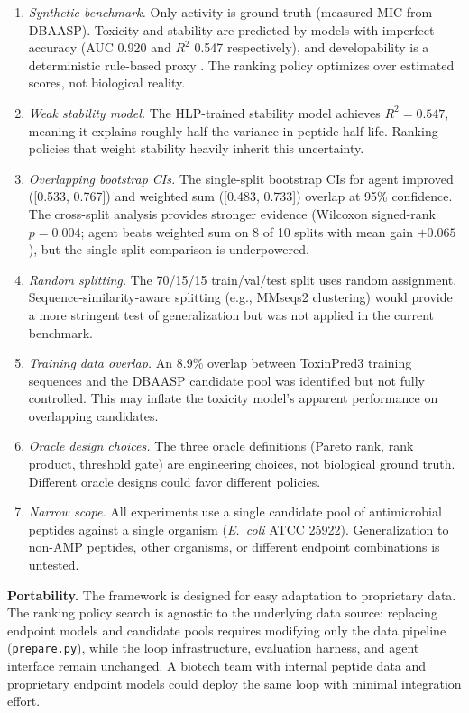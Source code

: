 \begin{enumerate}[nosep]
\item \emph{Synthetic benchmark.}
Only activity is ground truth (measured MIC from DBAASP).
Toxicity and stability are predicted by models with imperfect accuracy (AUC 0.920 and $R^2$ 0.547 respectively), and developability is a deterministic rule-based proxy \citep{fjell2012peptidedev}.
The ranking policy optimizes over estimated scores, not biological reality.

\item \emph{Weak stability model.}
The HLP-trained stability model achieves $R^2 = 0.547$, meaning it explains roughly half the variance in peptide half-life.
Ranking policies that weight stability heavily inherit this uncertainty.

\item \emph{Overlapping bootstrap CIs.}
The single-split bootstrap CIs for agent improved ([0.533, 0.767]) and weighted sum ([0.483, 0.733]) overlap at 95\% confidence.
The cross-split analysis provides stronger evidence (Wilcoxon signed-rank $p = 0.004$; agent beats weighted sum on 8 of 10 splits with mean gain $+0.065$), but the single-split comparison is underpowered.

\item \emph{Random splitting.}
The 70/15/15 train/val/test split uses random assignment.
Sequence-similarity-aware splitting (e.g., MMseqs2 clustering) would provide a more stringent test of generalization but was not applied in the current benchmark.

\item \emph{Training data overlap.}
An 8.9\% overlap between ToxinPred3 training sequences and the DBAASP candidate pool was identified but not fully controlled.
This may inflate the toxicity model's apparent performance on overlapping candidates.

\item \emph{Oracle design choices.}
The three oracle definitions (Pareto rank, rank product, threshold gate) are engineering choices, not biological ground truth.
Different oracle designs could favor different policies.

\item \emph{Narrow scope.}
All experiments use a single candidate pool of antimicrobial peptides against a single organism (\emph{E.~coli} ATCC 25922).
Generalization to non-AMP peptides, other organisms, or different endpoint combinations is untested.
\end{enumerate}

\textbf{Portability.}
The framework is designed for easy adaptation to proprietary data.
The ranking policy search is agnostic to the underlying data source: replacing endpoint models and candidate pools requires modifying only the data pipeline (\texttt{prepare.py}), while the loop infrastructure, evaluation harness, and agent interface remain unchanged.
A biotech team with internal peptide data and proprietary endpoint models could deploy the same loop with minimal integration effort.
